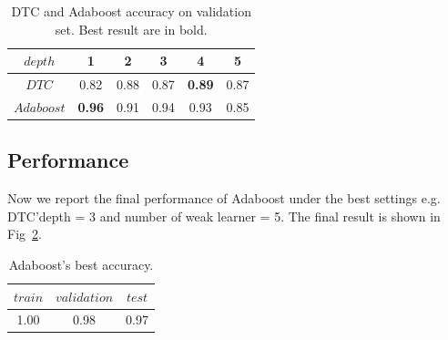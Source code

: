 \documentclass[journal, a4paper]{IEEEtran}
\begin{document}
\begin{table}[!hbt]
	\begin{center}
		\caption{DTC and Adaboost accuracy on validation set. Best result are in bold.}
		\label{tab:d_dtc_ad}
		\begin{tabular}{|c|c|c|c|c|c|}
			\hline
			$depth$  & 1 & 2 & 3 & 4 & 5 \\
			\hline
			$DTC$   & 0.82 & 0.88 & 0.87 & \textbf{0.89} & 0.87   \\
			\hline
			$Adaboost$  & \textbf{0.96} & 0.91 & 0.94 & 0.93 & 0.85 \\
			\hline
		\end{tabular}
	\end{center}
\end{table} \par

\subsection{Performance}
Now we report the final performance of Adaboost under the best settings e.g. DTC'depth = 3 and number of weak learner = 5. The final result is shown in Fig~\ref{tab:final_performance}.

\begin{table}[!hbt]
	\begin{center}
		\caption{Adaboost's best accuracy. }
		\label{tab:final_performance}
		\begin{tabular}{|c|c|c|}
			\hline
			$train$  & $validation$ & $test$  \\
			\hline
			1.00   & 0.98 & 0.97  \\
			\hline
		\end{tabular}
	\end{center}
\end{table} \par
\end{document}
